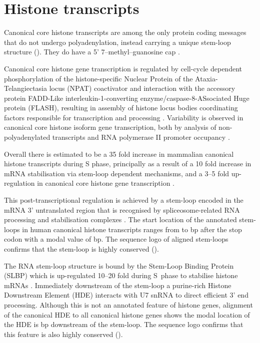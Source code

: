 \section{Histone transcripts}

  Canonical core histone transcripts are among the only protein coding messages
  that do not undergo polyadenylation,
  instead carrying a unique stem-loop structure ().
  They do have a 5' 7--methyl--guanosine cap \citep{MarzluffNatRevGen2008}.

  Canonical core histone gene transcription is regulated
  by cell-cycle dependent phosphorylation of the histone-specific
  Nuclear Protein of the Ataxia-Telangiectasia locus (NPAT) coactivator
  and interaction with the accessory protein
  FADD-Like interleukin-1\textbeta{}-converting
  enzyme/caspase-8-ASsociated Huge protein (FLASH),
  resulting in assembly of histone locus bodies
  coordinating factors responsible for transcription and processing
  \citep{MarzluffNatRevGen2008,RattrayMueller2012,Hoefig2014}.
  Variability is observed in canonical core histone isoform gene transcription,
  both by analysis of non-polyadenylated transcripts \citep{YangGenomeBiol2011}
  and RNA polymerase II promoter occupancy \citep{Ederveen2011}.

  Overall there is estimated to be a 35 fold increase in mammalian
  canonical histone transcripts during S phase,
  principally as a result of a 10 fold increase in mRNA stabilisation
  via stem-loop dependent mechanisms,
  and a 3--5 fold up-regulation in canonical core histone gene transcription \citep{HarrisMCB1991}.

  This post-transcriptional regulation is achieved by
  a stem-loop encoded in the mRNA 3' untranslated region
  that is recognised by spliceosome-related RNA
  processing and stabilisation complexes \citep{stem-loop-structure}.
  The start location of the annotated stem-loops in human canonical histone transcripts
  ranges from \StemLoopStartMin{} to \StemLoopStartMax{} bp after the stop codon
  with a modal value of \StemLoopStartMode{} bp.
  The sequence logo of aligned stem-loops confirms that the stem-loop is
  highly conserved ().

  The RNA stem-loop structure is bound by the Stem-Loop Binding Protein (SLBP)
  which is up-regulated 10--20 fold during S~phase to stabilise
  histone mRNAs \citep{SLBP-regulation}.
  Immediately downstream of the stem-loop a purine-rich Histone Downstream Element (HDE)
  interacts with U7 snRNA to direct efficient 3' end processing.
  Although this is not an annotated feature of histone genes,
  alignment of the canonical HDE \citep{HDE-sequence} to all canonical histone genes
  shows the modal location of the HDE is
  \HDEsDistanceFromStemLoopMode{} bp downstream of the stem-loop.
  The sequence logo confirms that this feature is also highly conserved ().

